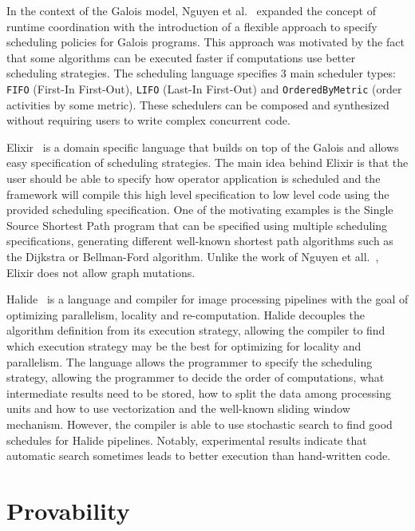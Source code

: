 In the context of the Galois model, Nguyen et al.~\cite{nguyen11} expanded the
concept of runtime coordination with the introduction of a flexible approach to specify
scheduling policies for Galois programs. This approach was motivated by the fact
that some algorithms can be executed faster if computations use better
scheduling strategies. The scheduling language specifies 3 main scheduler types:
\texttt{FIFO} (First-In First-Out), \texttt{LIFO} (Last-In First-Out) and
\texttt{OrderedByMetric} (order activities by some metric). These schedulers can
be composed and synthesized without requiring users to write complex concurrent
code.

Elixir~\cite{Prountzos:2012:ESS:2384616.2384644} is a domain specific language
that builds on top of the Galois and allows easy specification of scheduling
strategies.  The main idea behind Elixir is that the user should be able to
specify how operator application is scheduled and the framework will compile
this high level specification to low level code using the provided scheduling
specification. One of the motivating examples is the Single Source Shortest Path
program that can be specified using multiple scheduling specifications,
generating different well-known shortest path algorithms such as the
Dijkstra or Bellman-Ford algorithm. Unlike the work of Nguyen et
all.~\cite{nguyen11}, Elixir does not allow graph mutations.

Halide~\cite{Ragan-Kelley:2013:HLC:2491956.2462176} is a language and compiler
for image processing pipelines with the goal of optimizing parallelism, locality
and re-computation. Halide decouples the algorithm definition from its execution
strategy, allowing the compiler to find which execution strategy may be the best
for optimizing for locality and parallelism. The language allows the programmer
to specify the scheduling strategy, allowing the programmer to decide the order
of computations, what intermediate results need to be stored, how to split the
data among processing units and how to use vectorization and the well-known
sliding window mechanism. However, the compiler is able to use stochastic search
to find good schedules for Halide pipelines. Notably, experimental results
indicate that automatic search sometimes leads to better execution than
hand-written code.

\section{Provability}

